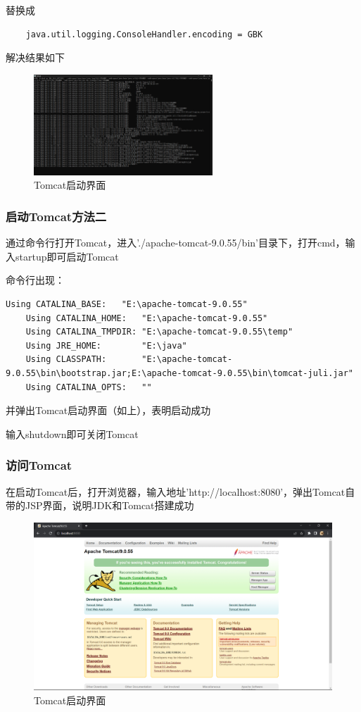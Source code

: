 \documentclass[UTF8,12pt]{article}
\begin{document}
替换成

\begin{lstlisting}
    java.util.logging.ConsoleHandler.encoding = GBK
\end{lstlisting}

解决结果如下

\begin{figure}[htbp]
    \centering
    \includegraphics[width=0.6\textwidth]{imgs/2.png}
    \caption{Tomcat启动界面}
\end{figure}

\subsubsection{启动Tomcat方法二}
通过命令行打开Tomcat，进入'./apache-tomcat-9.0.55/bin'目录下，打开cmd，输入startup即可启动Tomcat

命令行出现：
\begin{lstlisting}[frame=shadowbox]
    Using CATALINA_BASE:   "E:\apache-tomcat-9.0.55"
    Using CATALINA_HOME:   "E:\apache-tomcat-9.0.55"
    Using CATALINA_TMPDIR: "E:\apache-tomcat-9.0.55\temp"
    Using JRE_HOME:        "E:\java"
    Using CLASSPATH:       "E:\apache-tomcat-9.0.55\bin\bootstrap.jar;E:\apache-tomcat-9.0.55\bin\tomcat-juli.jar"
    Using CATALINA_OPTS:   ""
\end{lstlisting}

并弹出Tomcat启动界面（如上），表明启动成功

输入shutdown即可关闭Tomcat

\subsubsection{访问Tomcat}
在启动Tomcat后，打开浏览器，输入地址'http://localhost:8080'，弹出Tomcat自带的JSP界面，说明JDK和Tomcat搭建成功

\begin{figure}[htbp]
    \centering
    \includegraphics[width=1.0\textwidth]{imgs/3.png}
    \caption{Tomcat启动界面}
\end{figure}
\end{document}
